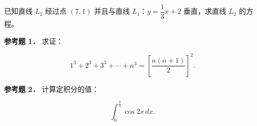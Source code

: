 \begin{question}
已知直线 $L_2$ 经过点 $(7,1)$ 并且与直线 $L_1$：$y=\dfrac13x+2$ 垂直，求直线 $L_2$ 的方程。

\textbf{参考题 1．} 求证：

\nopagebreak[4]
\[
1^3+2^3+3^3+\cdots+n^3=\left[\frac{n(n+1)}{2}\right]^2.
\]

\textbf{参考题 2．} 计算定积分的值：

\nopagebreak[4]
\[
\int_0^{\frac{\pi}{4}}\cos2x\,dx.
\]

\end{question}